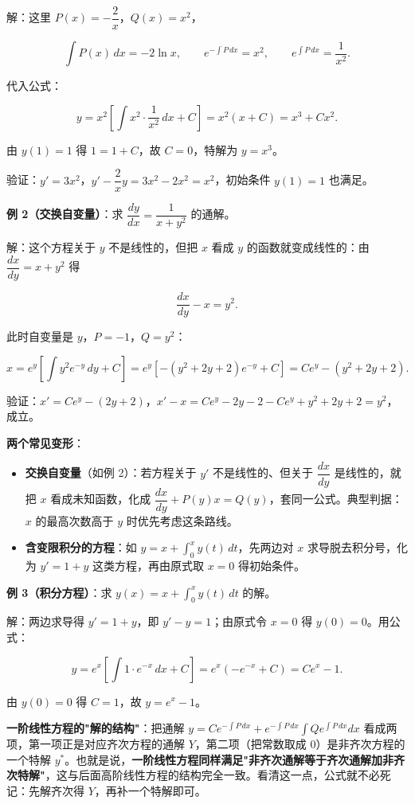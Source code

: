 \documentclass[11pt,openany,UTF8]{ctexbook}
\begin{document}
解：这里 $P(x)=-\dfrac2x$，$Q(x)=x^{2}$，

\[\int P(x)\,dx=-2\ln x,\qquad e^{-\int P\,dx}=x^{2},\qquad e^{\int P\,dx}=\frac{1}{x^{2}} .\]

代入公式：

\[y=x^{2}\left[\int x^{2}\cdot\frac{1}{x^{2}}\,dx+C\right]=x^{2}(x+C)=x^{3}+Cx^{2} .\]

由 $y(1)=1$ 得 $1=1+C$，故 $C=0$，特解为 $y=x^{3}$。

验证：$y'=3x^{2}$，$y'-\dfrac2xy=3x^{2}-2x^{2}=x^{2}$，初始条件 $y(1)=1$ 也满足。

\textbf{例 2（交换自变量）}：求 $\dfrac{dy}{dx}=\dfrac{1}{x+y^{2}}$ 的通解。

解：这个方程关于 $y$ 不是线性的，但把 $x$ 看成 $y$ 的函数就变成线性的：由 $\dfrac{dx}{dy}=x+y^{2}$ 得

\[\frac{dx}{dy}-x=y^{2}.\]

此时自变量是 $y$，$P=-1$，$Q=y^{2}$：

\[x=e^{y}\left[\int y^{2}e^{-y}\,dy+C\right]=e^{y}\left[-\left(y^{2}+2y+2\right)e^{-y}+C\right]=Ce^{y}-\left(y^{2}+2y+2\right).\]

验证：$x'=Ce^{y}-(2y+2)$，$x'-x=Ce^{y}-2y-2-Ce^{y}+y^{2}+2y+2=y^{2}$，成立。

\textbf{两个常见变形}：

\begin{itemize}
\item \textbf{交换自变量}（如例 2）：若方程关于 $y'$ 不是线性的、但关于 $\dfrac{dx}{dy}$ 是线性的，就把 $x$ 看成未知函数，化成 $\dfrac{dx}{dy}+P(y)x=Q(y)$，套同一公式。典型判据：$x$ 的最高次数高于 $y$ 时优先考虑这条路线。
\item \textbf{含变限积分的方程}：如 $y=x+\displaystyle\int_0^x y(t)\,dt$，先两边对 $x$ 求导脱去积分号，化为 $y'=1+y$ 这类方程，再由原式取 $x=0$ 得初始条件。
\end{itemize}
\textbf{例 3（积分方程）}：求 $y(x)=x+\displaystyle\int_0^x y(t)\,dt$ 的解。

解：两边求导得 $y'=1+y$，即 $y'-y=1$；由原式令 $x=0$ 得 $y(0)=0$。用公式：

\[y=e^{x}\left[\int 1\cdot e^{-x}\,dx+C\right]=e^{x}\left(-e^{-x}+C\right)=Ce^{x}-1 .\]

由 $y(0)=0$ 得 $C=1$，故 $y=e^{x}-1$。

\textbf{一阶线性方程的"解的结构"}：把通解 $y=Ce^{-\int P\,dx}+e^{-\int P\,dx}\displaystyle\int Qe^{\int P\,dx}dx$ 看成两项，第一项正是对应齐次方程的通解 $Y$，第二项（把常数取成 $0$）是非齐次方程的一个特解 $y^{*}$。也就是说，\textbf{一阶线性方程同样满足"非齐次通解等于齐次通解加非齐次特解"}，这与后面高阶线性方程的结构完全一致。看清这一点，公式就不必死记：先解齐次得 $Y$，再补一个特解即可。
\end{document}
